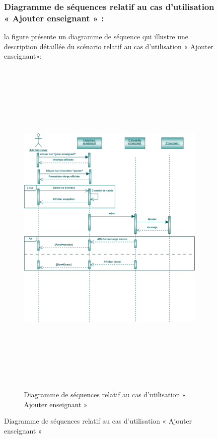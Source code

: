 \documentclass[12 pt]{report}
\begin{document}
\begin{figure}[h]
\begin{center}
{\begin{figure}[h]
\begin{center}
\end{center}
\end{figure}}
\newpage
\subsubsection{Diagramme de séquences relatif au cas d’utilisation « Ajouter enseignant » :}
la figure   présente un diagramme de séquence qui illustre une description détaillée du scénario relatif au cas d’utilisation « Ajouter enseignant»: 
{\begin{figure}[h]
 \begin{center}
\includegraphics[width= 18 cm ,height=  17cm]{sae.PNG}
\caption{Diagramme de séquences relatif au cas d’utilisation « Ajouter enseignant »}

\end{center}
\end{figure}}
\newpage

\end{center}
\end{figure}
\end{document}
